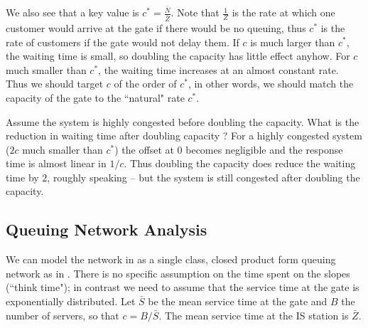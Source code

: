 We also see that a key value is
$c^*=\frac{\bar{N}}{\bar{Z}}$. Note that
$\frac{1}{Z}$ is the rate at which one customer
would arrive at the gate if there would be no queuing,
thus $c^*$ is the rate of customers if the gate
would not delay them. If $c$ is much larger than
$c^*$, the waiting time is small, so doubling the
capacity has little effect anyhow. For $c$ much
smaller than $c^*$, the waiting time increases at
an almost constant rate. Thus we should target
$c$ of the order of $c^*$, in other words, we
should match the capacity of the gate to the
``natural" rate $c^*$.
%

 {Assume the system is highly congested before
 doubling the capacity. What is the reduction in
 waiting time after doubling capacity ?
 }
 {For a highly congested system ($2c$ much smaller
than $c^*$) the offset at $0$ becomes negligible
and the response time is almost linear in $1/c$.
Thus doubling the capacity does reduce the
waiting time by $2$, roughly speaking -- but the
system is still congested after doubling the
capacity.
 }
\subsection{Queuing Network Analysis}
\label{sec-q-qnet-qnaskxidzesdfsa}
\begin{figure}[!htbp]
\begin{center}
\end{center}
\end{figure}
We can model the network in  as
a single class, closed product form queuing
network as in . There is no
specific assumption on the time spent on the
slopes (``think time"); in contrast we need to
assume that the service time at the gate is
exponentially distributed. Let $\bar{S}$ be the
mean service time at the gate and $B$ the number
of servers, so that $c=B/\bar{S}$. The mean
service time at the IS station is $\bar{Z}$.

